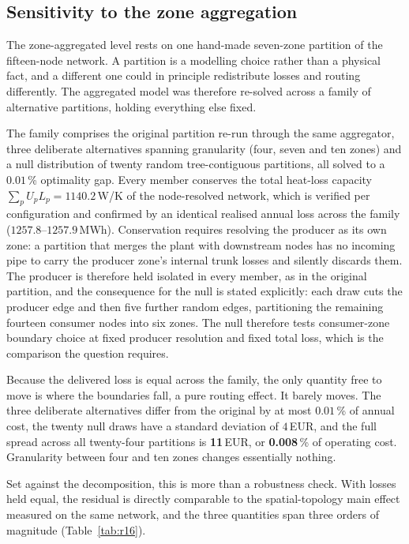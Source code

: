 \documentclass[a4paper,fleqn]{cas-sc}
\begin{document}
\subsection{Sensitivity to the zone aggregation}
\label{subsec:clustering}

The zone-aggregated level rests on one hand-made seven-zone partition of the fifteen-node
network. A partition is a modelling choice rather than a physical fact, and a different one
could in principle redistribute losses and routing differently. The aggregated model was
therefore re-solved across a family of alternative partitions, holding everything else fixed.

The family comprises the original partition re-run through the same aggregator, three
deliberate alternatives spanning granularity (four, seven and ten zones) and a null
distribution of twenty random tree-contiguous partitions, all solved to a $0.01$\,\%
optimality gap. Every member conserves the total heat-loss capacity
$\sum_p U_p L_p = 1140.2$\,W/K of the node-resolved network, which is verified per
configuration and confirmed by an identical realised annual loss across the family
($1257.8$--$1257.9$\,MWh). Conservation requires resolving the producer as its own zone: a
partition that merges the plant with downstream nodes has no incoming pipe to carry the
producer zone's internal trunk losses and silently discards them. The producer is therefore held
isolated in every member, as in the original partition, and the consequence for the null is
stated explicitly: each draw cuts the producer edge and then
five further random edges, partitioning the remaining fourteen consumer nodes into six
zones. The null therefore tests consumer-zone boundary choice at fixed producer resolution
and fixed total loss, which is the comparison the question requires.

Because the delivered loss is equal across the family, the only quantity free to move is
where the boundaries fall, a pure routing effect. It barely moves. The three deliberate
alternatives differ from the original by at most $0.01$\,\% of annual cost, the twenty null
draws have a standard deviation of $4$\,EUR, and the full spread across all twenty-four
partitions is \textbf{11}\,EUR, or \textbf{0.008}\,\% of operating cost. Granularity between
four and ten zones changes essentially nothing.

Set against the decomposition, this is more than a robustness check. With losses held
equal, the residual is directly comparable to the spatial-topology main effect measured on
the same network, and the three quantities span three orders of magnitude
(Table~\ref{tab:r16}).
\end{document}
